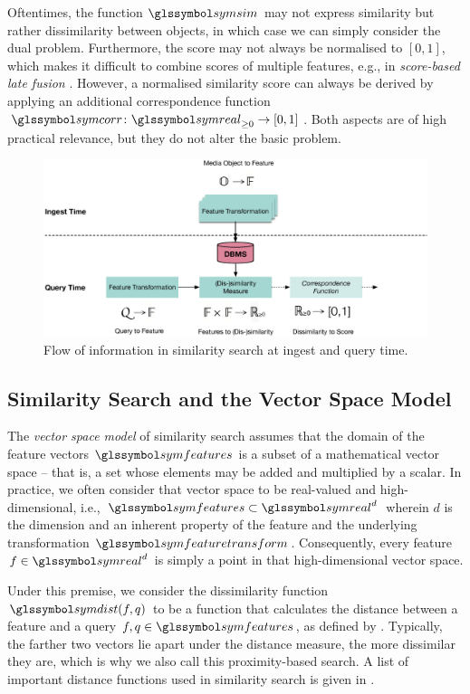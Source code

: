 Oftentimes, the function $\symsim$ may not express similarity but rather dissimilarity between objects, in which case we can simply consider the dual problem. Furthermore, the score may not always be normalised to $[0, 1]$, which makes it difficult to combine scores of multiple features, e.g., in \emph{score-based late fusion} \cite{Depeursinge:2010Fusion,Rossetto:2018Multi}. However, a normalised similarity score can always be derived by applying an additional correspondence function $\symcorr \colon \symreal_{\geq 0} \rightarrow [0, 1]$. Both aspects are of high practical relevance, but they do not alter the basic problem. 

\begin{figure}[tb]
    \centering
    \includegraphics[width=\textwidth]{figures/multimedia-retrieval-pipeline}
    \caption{Flow of information in similarity search at ingest and query time.}
    \label{figure:multimedia_retrieval_flow}
\end{figure}

\subsection{Similarity Search and the Vector Space Model}

The \emph{vector space model} of similarity search \cite{Salton:1975Vector} assumes that the domain of the feature vectors $\symfeatures$ is a subset of a mathematical vector space -- that is, a set whose elements may be added and multiplied by a scalar. In practice, we often consider that vector space to be real-valued and high-dimensional, i.e., $\symfeatures \subset \symreal^{d}$ wherein $d$ is the dimension and an inherent property of the feature and the underlying transformation $\symfeaturetransform$. Consequently, every feature $f \in \symreal^{d}$ is simply a point in that high-dimensional vector space.

Under this premise, we consider the dissimilarity function $\symdist(f,q)$ to be a function that calculates the distance between a feature and a query $f,q \in \symfeatures$, as defined by . Typically, the farther two vectors lie apart under the distance measure, the more dissimilar they are, which is why we also call this proximity-based search. A list of important distance functions used in similarity search is given in . 

